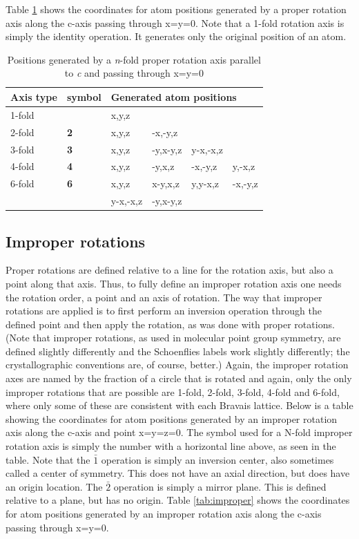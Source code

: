 Table \ref{tab:proper} shows the coordinates for atom positions generated by a proper rotation axis along the c-axis passing through x=y=0. Note that a 1-fold rotation axis is simply the identity operation. It generates only the original position of an atom. 
 
\begin{table}
\centering
\caption{Positions generated by a \textit{n}-fold proper rotation axis parallel to \textit{c} and passing through x=y=0}
\label{tab:proper}
\begin{tabular}{| p{} | p{} | l | l | l | l |}
\hline
Axis type & symbol & \multicolumn{4}{l|}{Generated atom positions} \\
\hline
1-fold &   & x,y,z  &   &   &   \\
\hline
2-fold & \textbf{2} & x,y,z & -x,-y,z &   &   \\
\hline
3-fold & \textbf{3} & x,y,z & -y,x-y,z & y-x,-x,z &  \\
\hline
4-fold & \textbf{4} & x,y,z & -y,x,z & -x,-y,z & y,-x,z  \\
\hline
6-fold & \textbf{6} & x,y,z & x-y,x,z & y,y-x,z & -x,-y,z \\
       &            & y-x,-x,z & -y,x-y,z & & \\
\hline
\end{tabular}

\end{table}

\subsection{Improper rotations} Proper rotations are defined relative to a line for the rotation axis, but also a point along that axis. Thus, to fully define an improper rotation axis one needs the rotation order, a point and an axis of rotation. The way that improper rotations are applied is to first perform an inversion operation through the defined point and then apply the rotation, as was done with proper rotations. (Note that improper rotations, as used in molecular point group symmetry, are defined slightly differently and the Schoenflies labels work slightly differently; the crystallographic conventions are, of course, better.) Again, the improper rotation axes are named by the fraction of a circle that is rotated and again, only the only improper rotations that are possible are 1-fold, 2-fold, 3-fold, 4-fold and 6-fold, where only some of these are consistent with each Bravais lattice. Below is a table showing the coordinates for atom positions generated by an improper rotation axis along the c-axis and point x=y=z=0. The symbol used for a N-fold improper rotation axis is simply the number with a horizontal line above, as seen in the table. Note that the $\bar{1}$ operation is simply an inversion center, also sometimes called a center of symmetry. This does not have an axial direction, but does have an origin location. The $\bar{2}$ operation is simply a mirror plane. This is defined relative to a plane, but has no origin. Table \ref{tab:improper} shows the coordinates for atom positions generated by an improper rotation axis along the c-axis passing through x=y=0.

